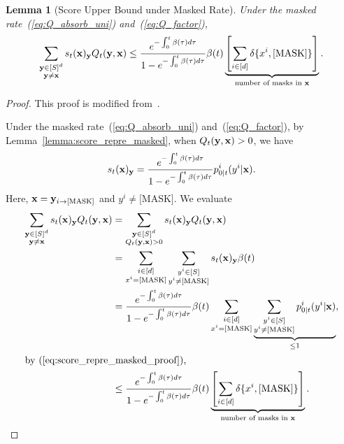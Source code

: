 \documentclass{article} %
\newtheorem{lemma}[theorem]{Lemma}
\def\eqref#1{equation~\ref{#1}}
\newcommand{\bfx}{{\bf x}}
\newcommand{\bfy}{ {\bf y}}
\newcommand{\mask}{\text{[MASK]}}
\renewcommand{\eqref}[1]{\textup{(\ref{#1})}}
\begin{document}
\begin{lemma}[Score Upper Bound under Masked Rate]\label{lemma:score_upper_bound_masked}
    Under the masked rate~\eqref{eq:Q_absorb_uni} and~\eqref{eq:Q_factor}, 
    \[
    \sum_{\substack{\bfy\in {[S]^d} \\ \bfy\neq \bfx}}  s_t(\bfx)_\bfy Q_t(\bfy, \bfx) \leq \frac{e^{-\int_0^t \beta(\tau) d\tau}}{1-e^{-\int_0^t \beta(\tau) d\tau}} \beta(t) \underbrace{\left[ \sum_{i \in [d]} \delta\{x^i, \mask\} \right]}_{\text{number of masks in $\bfx$}}.
    \]
\end{lemma}

\begin{proof}
This proof is modified from~\cite[Lemma~5]{liang2026absorb}.

Under the masked rate~\eqref{eq:Q_absorb_uni} and~\eqref{eq:Q_factor}, by Lemma~\ref{lemma:score_repre_masked}, when $Q_t(\bfy, \bfx)>0$, we have
\begin{equation}\label{eq:score_repre_masked_proof}
s_t(\bfx)_\bfy = \frac{e^{-\int_0^t \beta(\tau) d\tau}}{1-e^{-\int_0^t \beta(\tau) d\tau}} p_{0|t}^i (y^i|\bfx).
\end{equation}
Here, $\bfx=\bfy_{i \to \mask}$ and $y^i \neq \mask$. We evaluate
\begin{align*}
    \sum_{\substack{\bfy\in {[S]^d} \\ \bfy\neq \bfx}}  s_t(\bfx)_\bfy Q_t(\bfy, \bfx) &= \sum_{\substack{\bfy\in [S]^d \\ Q_t(\bfy, \bfx)>0}}  s_t(\bfx)_\bfy Q_t(\bfy, \bfx) \\
    &= \sum_{\substack{i \in [d] \\ x^i = \mask}} \sum_{\substack{y^i \in [S] \\ y^i \neq \mask}}  s_t(\bfx)_\bfy \beta(t) \\
    &= \frac{e^{-\int_0^t \beta(\tau) d\tau}}{1-e^{-\int_0^t \beta(\tau) d\tau}} \beta(t) \sum_{\substack{i \in [d] \\ x^i = \mask}} \underbrace{\sum_{\substack{y^i \in [S] \\ y^i \neq \mask}}  p_{0|t}^i (y^i|\bfx)}_{\leq 1}, \\
    \intertext{by~\eqref{eq:score_repre_masked_proof},}
    &\leq \frac{e^{-\int_0^t \beta(\tau) d\tau}}{1-e^{-\int_0^t \beta(\tau) d\tau}} \beta(t) \underbrace{\left[ \sum_{i \in [d]} \delta\{x^i, \mask\} \right]}_{\text{number of masks in $\bfx$}}.
\end{align*}
\end{proof}
\end{document}
